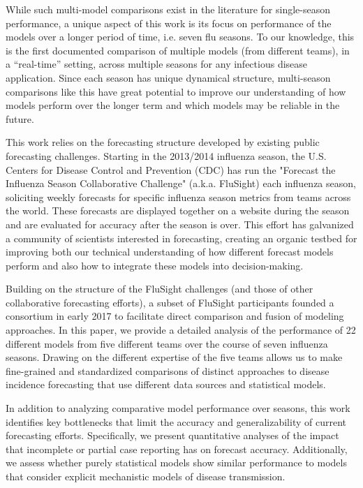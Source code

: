 \documentclass{article}
\begin{document}
While such multi-model comparisons exist in the literature for single-season performance, a unique aspect of this work is its focus on performance of the models over a longer period of time, i.e. seven flu seasons. 
To our knowledge, this is the first documented comparison of multiple models (from different teams), in a ``real-time'' setting, across multiple seasons for any infectious disease application.
Since each season has unique dynamical structure, multi-season comparisons like this have great potential to improve our understanding of how models perform over the longer term and which models may be reliable in the future.

This work relies on the forecasting structure developed by existing public forecasting challenges.
Starting in the 2013/2014 influenza season, the U.S. Centers for Disease Control and Prevention (CDC) has run the "Forecast the Influenza Season Collaborative Challenge" (a.k.a. FluSight) each influenza season, soliciting weekly forecasts for specific influenza season metrics from teams across the world.\cite{Biggerstaff2016,Biggerstaff2018}
These forecasts are displayed together on a website during the season and are evaluated for accuracy after the season is over.\cite{PhiResearchLab} 
This effort has galvanized a community of scientists interested in forecasting, creating an organic testbed for improving both our technical understanding of how different forecast models perform and also how to integrate these models into decision-making.


Building on the structure of the FluSight challenges (and those of other collaborative forecasting efforts\cite{Smith2017,Viboud2017}), a subset of FluSight participants founded a consortium in early 2017 to facilitate direct comparison and fusion of modeling approaches. 
In this paper, we provide a detailed analysis of the performance of 22 different models from five different teams over the course of seven influenza seasons.
Drawing on the different expertise of the five teams allows us to make fine-grained and standardized comparisons of distinct approaches to disease incidence forecasting that use different data sources and statistical models.

In addition to analyzing comparative model performance over seasons, this work identifies key bottlenecks that limit the accuracy and generalizability of current forecasting efforts.
Specifically, we present quantitative analyses of the impact that incomplete or partial case reporting has on forecast accuracy.
Additionally, we assess whether purely statistical models show similar performance to models that consider explicit mechanistic models of disease transmission.
\end{document}
